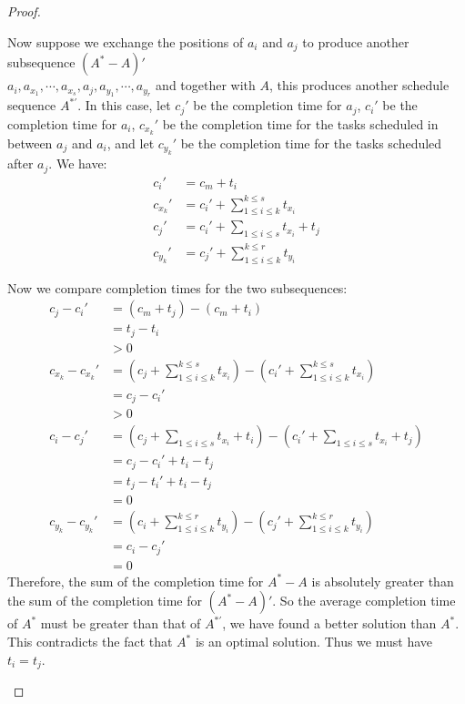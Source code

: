 \documentclass[11pt]{article}
\begin{document}
\begin{enumerate}
\begin{enumerate}
\begin{proof}
\begin{enumerate}
    Now suppose we exchange the positions of $a_i$ and $a_j$ to
    produce another subsequence $(A^*-A)'$\\
    $a_i,a_{x_1},\cdots,a_{x_s},a_j,a_{y_1},\cdots,a_{y_r}$ and
    together with $A$, this produces another schedule sequence $A^{*'}$. In this
    case, let $c_j'$ be the completion time for $a_j$, $c_i'$ be the
    completion time for $a_i$, $c_{x_k}'$ be
    the completion time for the tasks scheduled in between $a_j$ and
    $a_i$, and let $c_{y_k}'$ be the completion time for the tasks
    scheduled after $a_j$. We have:
    \begin{align}
      c_i' &= c_m + t_i\\
      c_{x_k}' &= c_i' + \sum_{1 \leq i \leq k}^{k \leq s}t_{x_i}\\
      c_j' &= c_i' + \sum_{1 \leq i \leq s}t_{x_i} + t_j\\
      c_{y_k}' &= c_j' + \sum_{1 \leq i \leq k}^{k \leq r}t_{y_i}
    \end{align}
    
    Now we compare completion times for the two subsequences:
    \begin{align}
      c_j - c_i' &= (c_m + t_j) - (c_m + t_i)\\
      &= t_j - t_i\\
      &> 0\\
      c_{x_k} - c_{x_k}' &= (c_j + \sum_{1 \leq i \leq k}^{k \leq
        s}t_{x_i}) - (c_i' + \sum_{1 \leq i \leq k}^{k \leq
        s}t_{x_i})\\ 
      &= c_j - c_i'\\
      &> 0\\
      c_i - c_j' &= (c_j + \sum_{1 \leq i \leq s}t_{x_i} + t_i) -
      (c_i' + \sum_{1 \leq i \leq s}t_{x_i} + t_j)\\ 
      &= c_j - c_i' + t_i - t_j\\
      &= t_j - t_i' + t_i - t_j\\
      &= 0\\
      c_{y_k} - c_{y_k}' &= (c_i + \sum_{1 \leq i \leq k}^{k \leq
        r}t_{y_i}) - (c_j' + \sum_{1 \leq i \leq k}^{k \leq
        r}t_{y_i})\\
      &= c_i - c_j'\\
      &= 0
    \end{align}
    Therefore, the sum of the completion time for $A^*-A$ is
    absolutely greater than the sum of the completion time for
    $(A^*-A)'$. So the average completion time of $A^*$ must be greater
    than that of $A^{*'}$, we have found a better solution than
    $A^*$. This contradicts the fact that $A^*$ is an optimal
    solution. Thus we must have $t_i = t_j$. 


\end{enumerate}
\end{proof}
\end{enumerate}
\end{enumerate}
\end{document}
